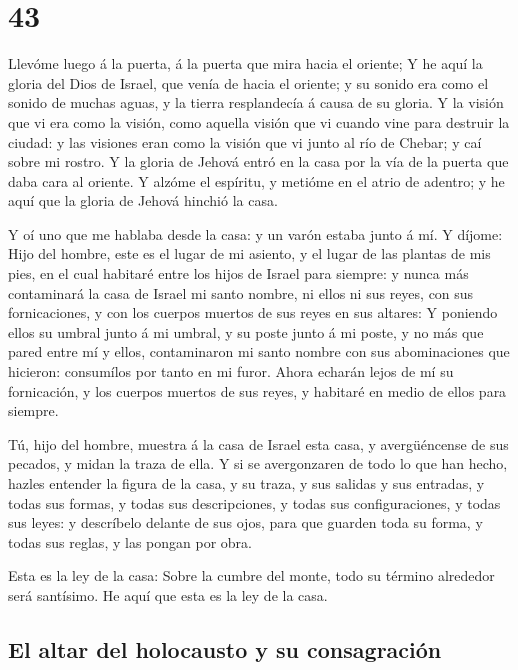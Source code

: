 \hypertarget{section-42}{%
\section{43}\label{section-42}}

 Llevóme luego á la puerta, á la puerta que mira hacia el
oriente;  Y he aquí la gloria del Dios de Israel, que
venía de hacia el oriente; y su sonido era como el sonido de muchas
aguas, y la tierra resplandecía á causa de su gloria.  Y
la visión que vi era como la visión, como aquella visión que vi cuando
vine para destruir la ciudad: y las visiones eran como la visión que vi
junto al río de Chebar; y caí sobre mi rostro.  Y la
gloria de Jehová entró en la casa por la vía de la puerta que daba cara
al oriente.  Y alzóme el espíritu, y metióme en el atrio
de adentro; y he aquí que la gloria de Jehová hinchió la casa.

 Y oí uno que me hablaba desde la casa: y un varón estaba
junto á mí.  Y díjome: Hijo del hombre, este es el lugar
de mi asiento, y el lugar de las plantas de mis pies, en el cual
habitaré entre los hijos de Israel para siempre: y nunca más contaminará
la casa de Israel mi santo nombre, ni ellos ni sus reyes, con sus
fornicaciones, y con los cuerpos muertos de sus reyes en sus altares:
 Y poniendo ellos su umbral junto á mi umbral, y su poste
junto á mi poste, y no más que pared entre mí y ellos, contaminaron mi
santo nombre con sus abominaciones que hicieron: consumílos por tanto en
mi furor.  Ahora echarán lejos de mí su fornicación, y los
cuerpos muertos de sus reyes, y habitaré en medio de ellos para siempre.

 Tú, hijo del hombre, muestra á la casa de Israel esta
casa, y avergüéncense de sus pecados, y midan la traza de ella.
 Y si se avergonzaren de todo lo que han hecho, hazles
entender la figura de la casa, y su traza, y sus salidas y sus entradas,
y todas sus formas, y todas sus descripciones, y todas sus
configuraciones, y todas sus leyes: y descríbelo delante de sus ojos,
para que guarden toda su forma, y todas sus reglas, y las pongan por
obra.

 Esta es la ley de la casa: Sobre la cumbre del monte,
todo su término alrededor será santísimo. He aquí que esta es la ley de
la casa.

\hypertarget{el-altar-del-holocausto-y-su-consagraciuxf3n}{%
\subsection{El altar del holocausto y su
consagración}\label{el-altar-del-holocausto-y-su-consagraciuxf3n}}

